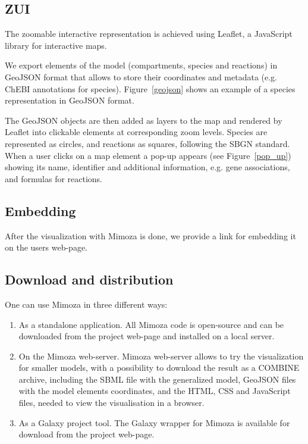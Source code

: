 \documentclass{bmcart}
\begin{document}
\subsection*{ZUI}

The zoomable interactive representation is achieved using Leaflet\cite{Agafonkin}, a JavaScript library for interactive maps. 

We export elements of the model (compartments, species and reactions) in GeoJSON format\cite{Butler} that allows to store their coordinates and metadata (e.g. ChEBI annotations for species). Figure~\ref{geojson} shows an example of a species representation in GeoJSON format. 

The GeoJSON objects are then added as layers to the map and rendered by Leaflet into clickable elements at corresponding zoom levels. Species are represented as circles, and reactions as squares, following the SBGN standard\cite{Moodie2011}.  When a user clicks on a map element a pop-up appears (see Figure~\ref{pop_up}) showing its name, identifier and additional information, e.g. gene associations, and formulas for reactions.
 

\subsection*{Embedding}
After the visualization with Mimoza is done, we provide a link for embedding it on the users web-page.

\subsection*{Download and distribution}

One can use Mimoza in three different ways:
\begin{enumerate}
\item As a standalone application.
All Mimoza code is open-source and can be downloaded from the project web-page\cite{Zhukovaa} and installed on a local server.
\item On the Mimoza web-server.
Mimoza web-server\cite{Zhukovaa} allows to try the visualization for smaller models, with a possibility to download the result as a COMBINE archive\cite{LeNovere}, including the SBML file with the generalized model, GeoJSON files with the model elements coordinates, and the HTML, CSS and JavaScript files, needed to view the visualisation in a browser.
\item As a Galaxy\cite{Blankenberg2010} project tool.
The Galaxy wrapper for Mimoza is available for download from the project web-page.
\end{enumerate}
\end{document}
